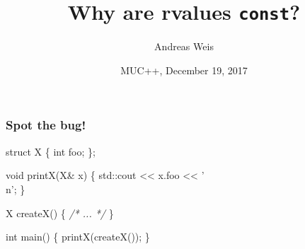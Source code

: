 \documentclass[aspectratio=43]{beamer}
\title{Why are rvalues \texttt{const}?}
\author{Andreas Weis}
\institute{BMW AG}
\date{MUC++, December 19, 2017}
\begin{document}
\frame{\titlepage}

\begin{frame}[fragile]
  \frametitle{Spot the bug!}
  \pause
  \begin{semiverbatim}
{\color{blue}struct} X \{
    {\color{blue}int} foo;
\};

{\color{blue}void} printX(X\& x) \{
    std::cout << x.foo << '\\n';
\}

X createX() \{ {\color{gray}\emph{/* ... */}} \}

{\color{blue}int} main()
\{
    printX(createX());
\}
  \end{semiverbatim}
\end{frame}
\end{document}

